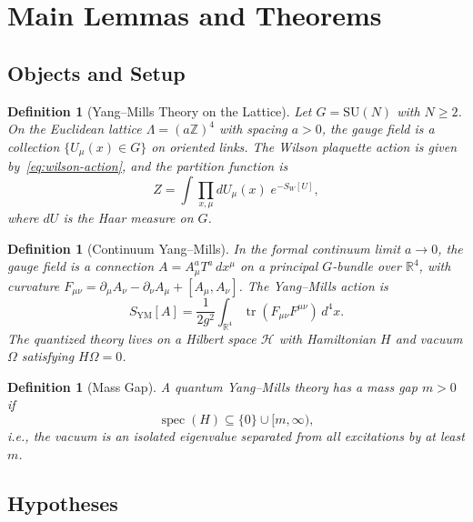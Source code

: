 \documentclass[11pt]{article}
\newtheorem{definition}[theorem]{Definition}
\DeclareMathOperator{\tr}{tr}
\DeclareMathOperator{\spec}{spec}
\begin{document}
\section{Main Lemmas and Theorems}
\label{sec:lemmas}

\subsection{Objects and Setup}

\begin{definition}[Yang--Mills Theory on the Lattice]
\label{def:ym-lattice}
Let $G = \mathrm{SU}(N)$ with $N \geq 2$.  On the Euclidean lattice
$\Lambda = (a\mathbb{Z})^4$ with spacing $a > 0$, the gauge field is
a collection $\{U_\mu(x) \in G\}$ on oriented links.  The Wilson
plaquette action is given by~\eqref{eq:wilson-action}, and the
partition function is
\[
  Z = \int \prod_{x,\mu} dU_\mu(x)\; e^{-S_W[U]},
\]
where $dU$ is the Haar measure on $G$.
\end{definition}

\begin{definition}[Continuum Yang--Mills]
\label{def:ym-continuum}
In the formal continuum limit $a \to 0$, the gauge field is a
connection $A = A_\mu^a T^a \,dx^\mu$ on a principal $G$-bundle over
$\mathbb{R}^4$, with curvature
$F_{\mu\nu} = \partial_\mu A_\nu - \partial_\nu A_\mu + [A_\mu, A_\nu]$.
The Yang--Mills action is
\begin{equation}\label{eq:ym-action}
  S_{\mathrm{YM}}[A] = \frac{1}{2g^2}
  \int_{\mathbb{R}^4} \tr(F_{\mu\nu} F^{\mu\nu})\, d^4x.
\end{equation}
The quantized theory lives on a Hilbert space $\mathcal{H}$ with
Hamiltonian $H$ and vacuum $\Omega$ satisfying $H\Omega = 0$.
\end{definition}

\begin{definition}[Mass Gap]
\label{def:mass-gap}
A quantum Yang--Mills theory has a \emph{mass gap} $m > 0$ if
\begin{equation}\label{eq:mass-gap-spec}
  \spec(H) \subseteq \{0\} \cup [m, \infty),
\end{equation}
i.e., the vacuum is an isolated eigenvalue separated from all
excitations by at least $m$.
\end{definition}

\subsection{Hypotheses}
\end{document}

